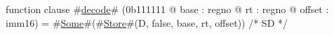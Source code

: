 function clause #\hyperref[zdecode]{decode}# (0b111111 @ base : regno @ rt : regno @ offset : imm16) =
  #\hyperref[zSome]{Some}#(#\hyperref[zStore]{Store}#(D, false, base, rt, offset)) /* SD */
